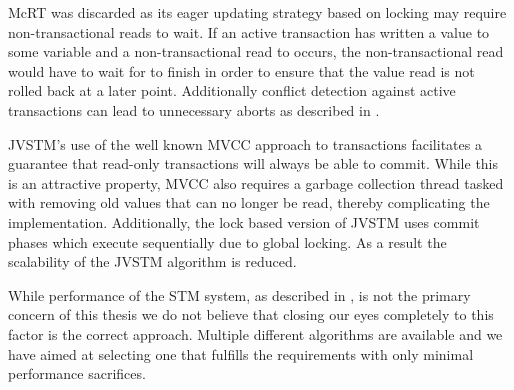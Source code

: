 McRT was discarded as its eager updating strategy based on locking may require non-transactional reads to wait. If an active transaction  has written a value to some variable  and a non-transactional read to  occurs, the non-transactional read would have to wait for  to finish in order to ensure that the value read is not rolled back at a later point. Additionally conflict detection against active transactions can lead to unnecessary aborts as described in .

JVSTM's use of the well known \ac{MVCC} approach to transactions facilitates a guarantee that read-only transactions will always be able to commit. While this is an attractive property, \ac{MVCC} also requires a garbage collection thread tasked with removing old values that can no longer be read, thereby complicating the implementation. Additionally, the lock based version of JVSTM uses commit phases which execute sequentially due to global locking. As a result the scalability of the  JVSTM algorithm is reduced\cite[p. 86]{cachopo2007development}.
 
While performance of the \ac{STM} system, as described in , is not the primary concern of this thesis we do not believe that closing our eyes completely to this factor is the correct approach. Multiple different algorithms are available and we have aimed at selecting one that fulfills the requirements with only minimal performance sacrifices. 




